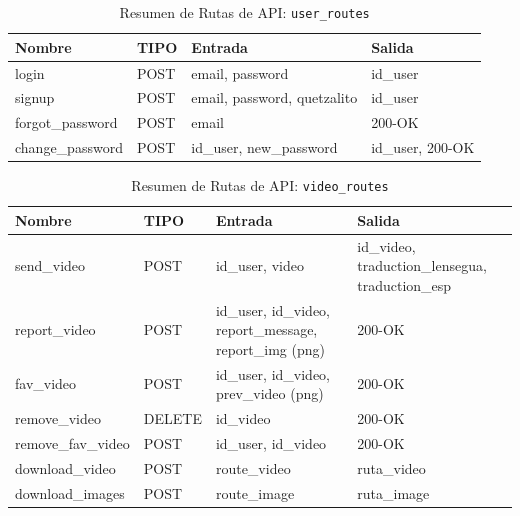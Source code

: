 
\begin{table}[H]
\centering
\begin{tabularx}{\textwidth}{|l|l|l|X|}
\hline
\textbf{Nombre} & \textbf{TIPO} & \textbf{Entrada} & \textbf{Salida} \\ \hline
login & POST & email, password & id\_user \\ \hline
signup & POST & email, password, quetzalito & id\_user \\ \hline
forgot\_password & POST & email & 200-OK \\ \hline
change\_password & POST & id\_user, new\_password & id\_user, 200-OK \\ \hline
\end{tabularx}
\caption{Resumen de Rutas de API: \texttt{user\_routes}}
\label{tab:user_routes}
\end{table}

\renewcommand{\arraystretch}{1.3} %
\begin{table}[H]
\centering
\begin{tabularx}{\textwidth}{|l|l|X|X|}
\hline
\textbf{Nombre} & \textbf{TIPO} & \textbf{Entrada} & \textbf{Salida} \\ \hline
send\_video & POST & id\_user, video & id\_video, traduction\_lensegua, traduction\_esp \\ \hline
report\_video & POST & id\_user, id\_video, report\_message, report\_img (png) & 200-OK \\ \hline
fav\_video & POST & id\_user, id\_video, prev\_video (png) & 200-OK \\ \hline
remove\_video & DELETE & id\_video & 200-OK \\ \hline
remove\_fav\_video & POST & id\_user, id\_video & 200-OK \\ \hline
download\_video & POST & route\_video & ruta\_video \\ \hline
download\_images & POST & route\_image & ruta\_image \\ \hline
\end{tabularx}
\caption{Resumen de Rutas de API: \texttt{video\_routes}}
\label{tab:video_routes}
\end{table}

